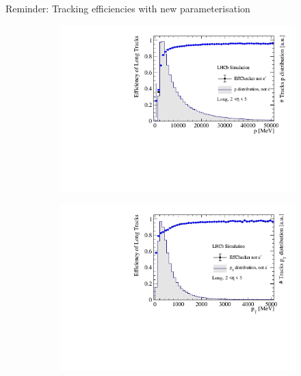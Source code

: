 \documentclass[xcolor={dvipsnames}]{beamer}
\begin{document}
\begin{frame}{Reminder: Tracking efficiencies with new parameterisation}
  \vspace{0.0cm}
  \begin{figure}[htb]
    \centering
    \begin{subfigure}{0.45\textwidth}
      \includegraphics[width=1\textwidth]{Plots/TrackEfficiency_p_improved_MC_parameterisation.pdf}
    \end{subfigure}%
    \begin{subfigure}{0.45\textwidth}
      \includegraphics[width=1\textwidth]{Plots/TrackEfficiency_pt_improved_MC_parameterisation.pdf}
    \end{subfigure}
    \begin{subfigure}{0.45\textwidth}

\end{subfigure}
\end{figure}
\end{frame}
\end{document}
